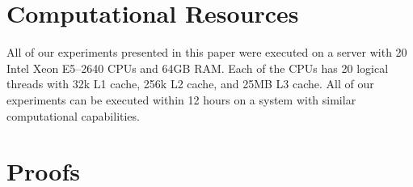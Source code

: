 \documentclass[twoside]{article} %
\begin{document}
\section{Computational Resources}\label{section:resources}
 All of our experiments presented in this paper were executed on a server with 20 Intel Xeon E5--2640 CPUs and 64GB RAM.
Each of the CPUs has 20 logical threads with 32k L1 cache, 256k L2 cache, and 25MB L3 cache.
All of our experiments can be executed within 12 hours on a system with similar computational capabilities.




\section{Proofs}\label{section:proofs}


%
\printProofs
\end{document}
